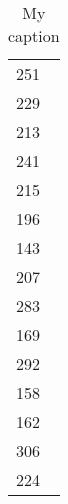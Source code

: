 \documentclass[12pt]{article}
\begin{document}
\begin{table}[]
\begin{tabular}{|l|}
251             \\
229             \\
213             \\
241             \\
215             \\
196             \\
143             \\
207             \\
283             \\
169             \\
292             \\
158             \\
162             \\
306             \\
224
\end{tabular}
\caption{My caption}
\label{my-label}
\end{table}
\end{document}
